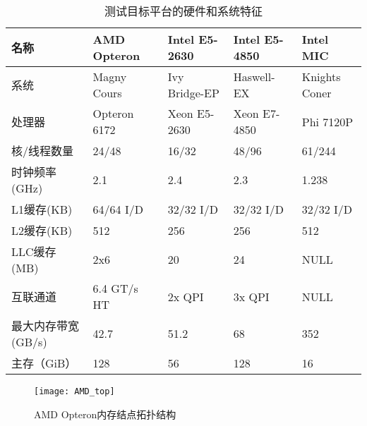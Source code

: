 \begin{table}[htbp]
  \centering
  \caption{测试目标平台的硬件和系统特征}
  \label{tab:arch_info}
  \begin{tabular}{lllll}
    \toprule
       名称             & AMD Opteron           & Intel E5-2630       & Intel E5-4850     & Intel MIC \\
    \midrule
      系统               & Magny Cours      &  Ivy Bridge-EP        &  Haswell-EX         &  Knights Coner \\
      处理器             &  Opteron 6172         &  Xeon E5-2630      & Xeon E7-4850     &  Phi 7120P \\
      核/线程数量         & 24/48                & 16/32                & 48/96              & 61/244 \\
      时钟频率(GHz)       & 2.1                  & 2.4                  & 2.3               & 1.238 \\
      L1缓存(KB)         & 64/64 I/D             & 32/32 I/D            & 32/32 I/D         & 32/32 I/D \\
      L2缓存(KB)         & 512                  & 256                   & 256               & 512 \\
      LLC缓存(MB)        & 2x6                  & 20                    & 24                & NULL \\
      互联通道            & 6.4 GT/s HT          & 2x QPI               & 3x QPI             & NULL \\
      最大内存带宽(GB/s)   & 42.7                 & 51.2                 & 68                & 352   \\
      主存（GiB）         & 128                   & 56                  & 128                & 16 \\
    \bottomrule
  \end{tabular}
\end{table}

\begin{figure}[htbp]
\centering
\texttt{[image: AMD\_top]}
\caption{AMD Opteron内存结点拓扑结构}\label{fig:AMD_top}
\end{figure}

